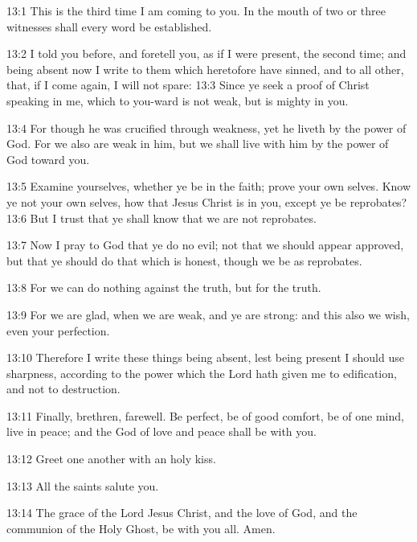 13:1 This is the third time I am coming to you. In the mouth of two or three witnesses shall every word be established.

13:2 I told you before, and foretell you, as if I were present, the second time; and being absent now I write to them which heretofore have sinned, and to all other, that, if I come again, I will not spare: 13:3 Since ye seek a proof of Christ speaking in me, which to you-ward is not weak, but is mighty in you.

13:4 For though he was crucified through weakness, yet he liveth by the power of God. For we also are weak in him, but we shall live with him by the power of God toward you.

13:5 Examine yourselves, whether ye be in the faith; prove your own selves. Know ye not your own selves, how that Jesus Christ is in you, except ye be reprobates?  13:6 But I trust that ye shall know that we are not reprobates.

13:7 Now I pray to God that ye do no evil; not that we should appear approved, but that ye should do that which is honest, though we be as reprobates.

13:8 For we can do nothing against the truth, but for the truth.

13:9 For we are glad, when we are weak, and ye are strong: and this also we wish, even your perfection.

13:10 Therefore I write these things being absent, lest being present I should use sharpness, according to the power which the Lord hath given me to edification, and not to destruction.

13:11 Finally, brethren, farewell. Be perfect, be of good comfort, be of one mind, live in peace; and the God of love and peace shall be with you.

13:12 Greet one another with an holy kiss.

13:13 All the saints salute you.

13:14 The grace of the Lord Jesus Christ, and the love of God, and the communion of the Holy Ghost, be with you all. Amen.

